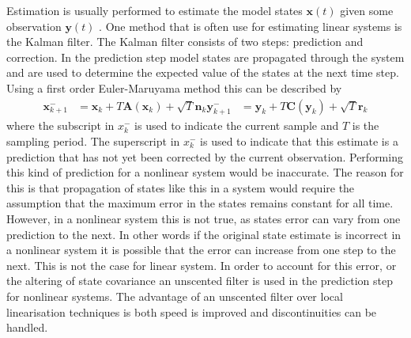Estimation is usually performed to estimate the model states $\mathbf{x}(t)$ given some observation $\mathbf{y}(t)$ . One method that is often use for estimating linear systems is the Kalman filter. The Kalman filter consists of two steps: prediction and correction. In the prediction step model states are propagated through the system and are used to determine the expected value of the states at the next time step. Using a first order Euler-Maruyama method this can be described by \begin{align}
\mathbf{x}_{k+1}^{-} &= \mathbf{x}_{k} + T\mathbf{A}(\mathbf{x}_{k}) +\sqrt{T}\mathbf{n}_{k}
\label{eqn: YProp}
\mathbf{y}_{k+1}^{-}  &= \mathbf{y}_{k} + T\mathbf{C}(\mathbf{y}_{k}) +\sqrt{T}\mathbf{r}_{k}
\end{align} where the subscript in $x_{k}^{-}$ is used to indicate the current sample and $T$ is the sampling period. The superscript in $x_{k}^{-}$ is used to indicate that this estimate is a prediction that has not yet been corrected by the current observation. Performing this kind of prediction for a nonlinear system would be inaccurate. The reason for this is that propagation of states like this in a system would require the assumption that the maximum error in the states remains constant for all time. However, in a nonlinear system this is not true, as states error can vary from one prediction to the next. In other words if the original state estimate is incorrect in a nonlinear system it is possible that the error can increase from one step to the next. This is not the case for linear system. In order to account for this error, or the altering of state covariance an unscented filter is used in the prediction step for nonlinear systems. The advantage of an unscented filter over local linearisation techniques is both speed is improved and discontinuities can be handled. 

